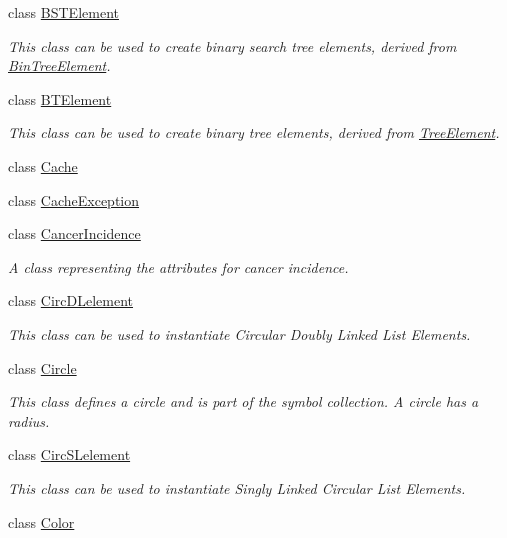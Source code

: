 \begin{DoxyCompactItemize}
class \mbox{\hyperlink{classbridges_1_1_b_s_t_element}{B\+S\+T\+Element}}
\begin{DoxyCompactList}\small\item\em This class can be used to create binary search tree elements, derived from \mbox{\hyperlink{classbridges_1_1_bin_tree_element}{Bin\+Tree\+Element}}. \end{DoxyCompactList}\item 
class \mbox{\hyperlink{classbridges_1_1_b_t_element}{B\+T\+Element}}
\begin{DoxyCompactList}\small\item\em This class can be used to create binary tree elements, derived from \mbox{\hyperlink{classbridges_1_1_tree_element}{Tree\+Element}}. \end{DoxyCompactList}\item 
class \mbox{\hyperlink{classbridges_1_1_cache}{Cache}}
\item 
class \mbox{\hyperlink{classbridges_1_1_cache_exception}{Cache\+Exception}}
\item 
class \mbox{\hyperlink{classbridges_1_1_cancer_incidence}{Cancer\+Incidence}}
\begin{DoxyCompactList}\small\item\em A class representing the attributes for cancer incidence. \end{DoxyCompactList}\item 
class \mbox{\hyperlink{classbridges_1_1_circ_d_lelement}{Circ\+D\+Lelement}}
\begin{DoxyCompactList}\small\item\em This class can be used to instantiate Circular Doubly Linked List Elements. \end{DoxyCompactList}\item 
class \mbox{\hyperlink{classbridges_1_1_circle}{Circle}}
\begin{DoxyCompactList}\small\item\em This class defines a circle and is part of the symbol collection. A circle has a radius. \end{DoxyCompactList}\item 
class \mbox{\hyperlink{classbridges_1_1_circ_s_lelement}{Circ\+S\+Lelement}}
\begin{DoxyCompactList}\small\item\em This class can be used to instantiate Singly Linked Circular List Elements. \end{DoxyCompactList}\item 
class \mbox{\hyperlink{classbridges_1_1_color}{Color}}

\end{DoxyCompactItemize}
